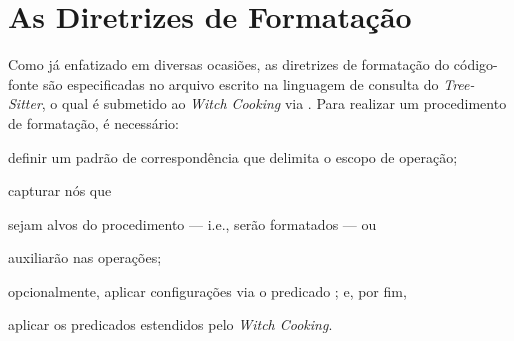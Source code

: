 \documentclass
  [11pt,a4paper,english,brazil,openright,sumario=tradicional,twoside]
  {abntex2}
\newcommand{\treesitter}{\textit{Tree-Sitter}\xspace}
\newcommand{\witchcooking}{\textit{Witch Cooking}\xspace}
\begin{document}

  \section{As Diretrizes de Formatação}
  \label{section:guidelines}

  Como já enfatizado em diversas ocasiões, as diretrizes de formatação do
  código-fonte são especificadas no arquivo escrito na linguagem de consulta do
  \treesitter, o qual é submetido ao \witchcooking via
  . Para realizar um procedimento de formatação, é
  necessário:
  \begin{inparaenum}
    \item definir um padrão de correspondência que delimita o escopo de
          operação;
    \item capturar nós que
          \begin{inparaenum}
            \item sejam alvos do procedimento --- i.e., serão formatados --- ou
            \item auxiliarão nas operações;
          \end{inparaenum}
    \item opcionalmente, aplicar configurações via o predicado
          ; e, por fim,
    \item aplicar os predicados estendidos pelo \witchcooking.
  \end{inparaenum}
\end{document}
